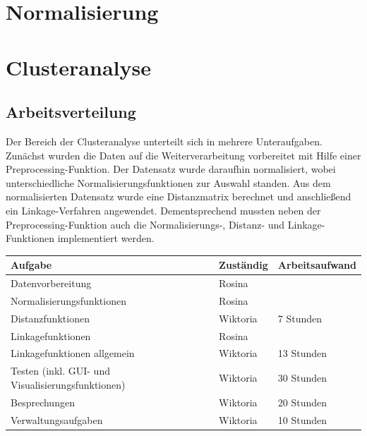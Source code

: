 \documentclass[12pt]{article}
\begin{document}
\section{Normalisierung}
\label{normalisierung}




\newpage
\pagestyle{fancy}
\fancyhead{}

\section{Clusteranalyse}
\label{clusteranalyse}

\subsection{Arbeitsverteilung}
\label{cluster-arbeitsverteilung}
Der Bereich der Clusteranalyse unterteilt sich in mehrere Unteraufgaben. Zunächst wurden die Daten auf die Weiterverarbeitung vorbereitet mit Hilfe einer Preprocessing-Funktion. Der Datensatz wurde daraufhin normalisiert, wobei unterschiedliche Normalisierungsfunktionen zur Auswahl standen. Aus dem normalisierten Datensatz wurde eine Distanzmatrix berechnet und anschließend ein Linkage-Verfahren angewendet. Dementsprechend mussten neben der Preprocessing-Funktion auch die Normalisierungs-, Distanz- und Linkage-Funktionen implementiert werden. 

\begin{table}[]
	\begin{tabular}{l|l|l}
		Aufgabe                       & Zuständig & Arbeitsaufwand \\ 
		\hline
		Datenvorbereitung             & Rosina    &                \\
		Normalisierungsfunktionen     & Rosina    &                \\ 
		Distanzfunktionen             & Wiktoria  & 7 Stunden      \\ 
		Linkagefunktionen			  & Rosina    &                \\
		Linkagefunktionen allgemein   & Wiktoria  & 13 Stunden     \\
		Testen (inkl. GUI- und Visualisierungsfunktionen)    & Wiktoria  & 30 Stunden     \\ 
		Besprechungen 				  & Wiktoria  & 20 Stunden     \\
		Verwaltungsaufgaben           & Wiktoria  & 10 Stunden     \\
		
	\end{tabular}
\end{table}
\end{document}

